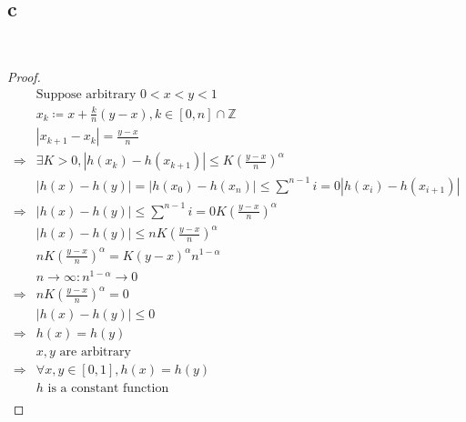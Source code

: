 \documentclass{article}
\begin{document}
~

\subsection*{c}

~

\begin{proof}
    \begin{align*}
        &\text{Suppose arbitrary }0<x<y<1\\
        &x_k\coloneqq x+\frac{k}{n}(y-x),k\in[0,n]\cap\mathbb{Z}\\
        &|x_{k+1}-x_k|=\frac{y-x}{n}\\
        \Rightarrow&\exists K>0,|h(x_k)-h(x_{k+1})|\leqslant K(\frac{y-x}{n})^\alpha\\
        &|h(x)-h(y)|=|h(x_0)-h(x_n)|\leqslant\sum^{n-1}{i=0}|h(x_i)-h(x_{i+1})|\\
        \Rightarrow&|h(x)-h(y)|\leqslant \sum^{n-1}{i=0}K(\frac{y-x}{n})^\alpha\\
        &|h(x)-h(y)|\leqslant nK(\frac{y-x}{n})^\alpha\\
        &nK(\frac{y-x}{n})^\alpha=K(y-x)^\alpha n^{1-\alpha}\\
        &n\to\infty:n^{1-\alpha}\to0\\
        \Rightarrow&nK(\frac{y-x}{n})^\alpha=0\\
        &|h(x)-h(y)|\leqslant0\\
        \Rightarrow&h(x)=h(y)\\
        &x,y\text{ are arbitrary}\\
        \Rightarrow&\forall x,y\in [0,1],h(x)=h(y)\\
        &h\text{ is a constant function}\\
    \end{align*}
\end{proof}
\end{document}
